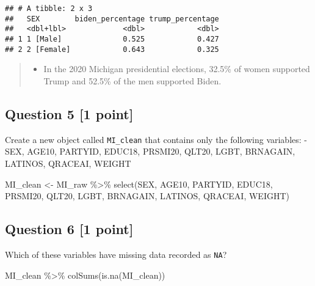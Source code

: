 \documentclass[
]{article}
\newenvironment{Shaded}{\begin{snugshade}}{\end{snugshade}}
\newcommand{\FunctionTok}[1]{\textcolor[rgb]{0.00,0.00,0.00}{#1}}
\newcommand{\NormalTok}[1]{#1}
\newcommand{\OtherTok}[1]{\textcolor[rgb]{0.56,0.35,0.01}{#1}}
\newcommand{\SpecialCharTok}[1]{\textcolor[rgb]{0.00,0.00,0.00}{#1}}
\providecommand{\tightlist}{%
  \setlength{\itemsep}{0pt}\setlength{\parskip}{0pt}}
\begin{document}
\begin{verbatim}
## # A tibble: 2 x 3
##   SEX        biden_percentage trump_percentage
##   <dbl+lbl>             <dbl>            <dbl>
## 1 1 [Male]              0.525            0.427
## 2 2 [Female]            0.643            0.325
\end{verbatim}

\begin{quote}
\begin{itemize}
\tightlist
\item
  In the 2020 Michigan presidential elections, 32.5\% of women supported
  Trump and 52.5\% of the men supported Biden.
\end{itemize}
\end{quote}

\hypertarget{question-5-1-point}{%
\subsection{Question 5 {[}1 point{]}}\label{question-5-1-point}}

Create a new object called \texttt{MI\_clean} that contains only the
following variables: - SEX, AGE10, PARTYID, EDUC18, PRSMI20, QLT20,
LGBT, BRNAGAIN, LATINOS, QRACEAI, WEIGHT

\begin{Shaded}
\begin{Highlighting}[]
\NormalTok{MI\_clean }\OtherTok{\textless{}{-}}\NormalTok{ MI\_raw }\SpecialCharTok{\%\textgreater{}\%}
  \FunctionTok{select}\NormalTok{(SEX, AGE10, PARTYID, EDUC18, PRSMI20, QLT20, LGBT, BRNAGAIN, LATINOS, QRACEAI, WEIGHT)}
\end{Highlighting}
\end{Shaded}

\hypertarget{question-6-1-point}{%
\subsection{Question 6 {[}1 point{]}}\label{question-6-1-point}}

Which of these variables have missing data recorded as \texttt{NA}?

\begin{Shaded}
\begin{Highlighting}[]
\NormalTok{MI\_clean }\SpecialCharTok{\%\textgreater{}\%}
  \FunctionTok{colSums}\NormalTok{(}\FunctionTok{is.na}\NormalTok{(MI\_clean))}
\end{Highlighting}
\end{Shaded}
\end{document}
